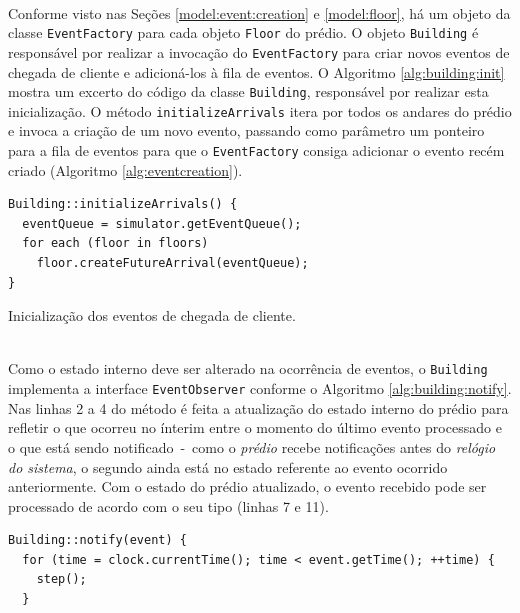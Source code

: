 \begin{description}\setlength\itemsep{0mm}
  \item[Inicializar a lista de chegadas de clientes] \hfill \\
    Conforme visto nas Seções \ref{model:event:creation} e \ref{model:floor}, há
    um objeto da classe \texttt{EventFactory} para cada objeto \texttt{Floor} do
    prédio. O objeto \texttt{Building} é responsável por realizar a invocação do
    \texttt{EventFactory} para criar novos eventos de chegada de cliente e
    adicioná-los à fila de eventos. O Algoritmo \ref{alg:building:init} mostra
    um excerto do código da classe \texttt{Building}, responsável por realizar
    esta inicialização. O método \texttt{initializeArrivals} itera por todos os
    andares do prédio e invoca a criação de um novo evento, passando como
    parâmetro um ponteiro para a fila de eventos para que o
    \texttt{EventFactory} consiga adicionar o evento recém criado (Algoritmo
    \ref{alg:eventcreation}).

    \begin{algorithm}[htb!]
      \centering
        \begin{verbatim}
Building::initializeArrivals() {
  eventQueue = simulator.getEventQueue();
  for each (floor in floors)
    floor.createFutureArrival(eventQueue);
}
        \end{verbatim}
      \caption{Inicialização dos eventos de chegada de cliente.}
      \label{alg:building:init}
    \end{algorithm}

  \item[Reagir à ocorrência de eventos] \hfill \\
    Como o estado interno deve ser alterado na ocorrência de eventos, o
    \texttt{Building} implementa a interface \texttt{EventObserver} conforme o
    Algoritmo \ref{alg:building:notify}. Nas linhas 2 a 4 do método é feita a
    atualização do estado interno do prédio para refletir o que ocorreu no
    ínterim entre o momento do último evento processado e o que está sendo
    notificado~-~como o \textit{prédio} recebe notificações antes do
    \textit{relógio do sistema}, o segundo ainda está no estado referente ao
    evento ocorrido anteriormente. Com o estado do prédio atualizado, o evento
    recebido pode ser processado de acordo com o seu tipo (linhas 7 e 11).

    \begin{algorithm}[htb!]
      \centering
        \begin{verbatim}
Building::notify(event) {
  for (time = clock.currentTime(); time < event.getTime(); ++time) {
    step();
  }


\end{verbatim}
\end{algorithm}
\end{description}
